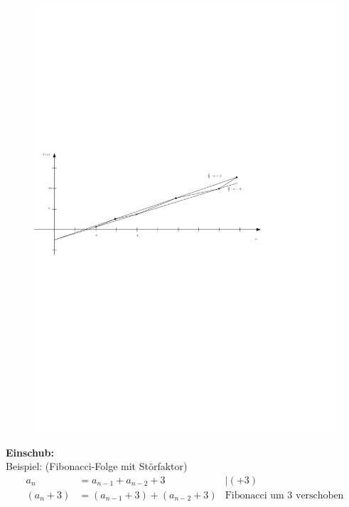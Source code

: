 \begin{figure}[h]
    \begin{center}
        \includegraphics[width=\textwidth]{../GFX/vl4_fig_1.pdf}
        \label{fig:graph}
    \end{center}
\end{figure}
%
\textbf{Einschub:}\\
Beispiel: (Fibonacci-Folge mit Störfaktor)\\
\begin{align*}
    a_n &= a_{n-1}+a_{n-2}+3 &|(+3)\\
    (a_n+3) &=  (a_{n-1}+3) + (a_{n-2}+3)&\text{Fibonacci um 3 verschoben}\\
\end{align*}
